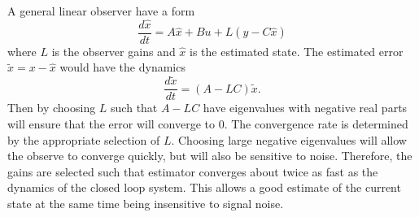 \documentclass[superscriptaddress,floatfix,reprint,amssymb, amsmath,aps, pre]{revtex4-1}
\begin{document}
{{{            A general linear observer have a form 
            \begin{equation}
                \frac{d \hat x}{dt} = A\hat x + Bu + L(y - C\hat x)
            \end{equation}
            where \(L\) is the observer gains and \(\hat x\) is the estimated state. The estimated error \(\tilde{x}=x-\hat{x}\) would have the dynamics 
            \begin{equation}
                \frac{d \tilde{x}}{d t}=(A-L C) \tilde{x}.
            \end{equation}
            Then by choosing \(L\) such that \(A - LC\) have eigenvalues with negative real parts will ensure that the error will converge to \(0\). The convergence rate is determined by the appropriate selection of \(L\). Choosing large negative eigenvalues will allow the observe to converge quickly, but will also be sensitive to noise. Therefore, the gains are selected such that estimator converges about twice as fast as the dynamics of the closed loop system. This allows a good estimate of the current state at the same time being insensitive to signal noise. 

}}}
\end{document}
